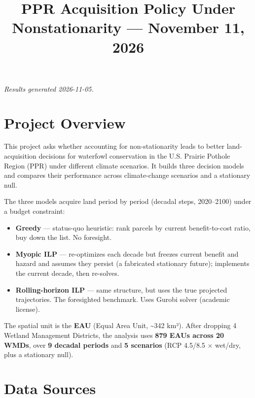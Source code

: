 \documentclass[
  letterpaper,
  DIV=11,
  numbers=noendperiod]{scrartcl}
\title{PPR Acquisition Policy Under Nonstationarity --- November 11,
2026}
\author{}
\date{}
\providecommand{\tightlist}{%
  \setlength{\itemsep}{0pt}\setlength{\parskip}{0pt}}
\begin{document}
\maketitle

\vspace{-2\baselineskip}


\emph{Results generated 2026-11-05.}

\section{Project Overview}\label{project-overview}

This project asks whether accounting for non-stationarity leads to
better land-acquisition decisions for waterfowl conservation in the U.S.
Prairie Pothole Region (PPR) under different climate scenarios. It
builds three decision models and compares their performance across
climate-change scenarios and a stationary null.

The three models acquire land period by period (decadal steps,
2020--2100) under a budget constraint:

\begin{itemize}
\tightlist
\item
  \textbf{Greedy} --- status-quo heuristic: rank parcels by current
  benefit-to-cost ratio, buy down the list. No foresight.
\item
  \textbf{Myopic ILP} --- re-optimizes each decade but freezes current
  benefit and hazard and assumes they persist (a fabricated stationary
  future); implements the current decade, then re-solves.
\item
  \textbf{Rolling-horizon ILP} --- same structure, but uses the true
  projected trajectories. The foresighted benchmark. Uses Gurobi solver
  (academic license).
\end{itemize}

The spatial unit is the \textbf{EAU} (Equal Area Unit,
\textasciitilde342 km²). After dropping 4 Wetland Management Districts,
the analysis uses \textbf{879 EAUs across 20 WMDs}, over \textbf{9
decadal periods} and \textbf{5 scenarios} (RCP 4.5/8.5 × wet/dry, plus a
stationary null).

\section{Data Sources}\label{data-sources}
\end{document}
